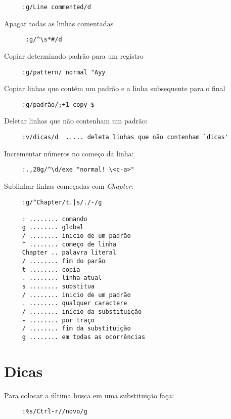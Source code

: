 \begin{verbatim}
     :g/Line commented/d
\end{verbatim}

Apagar todas as linhas comentadas

\begin{verbatim}
      :g/^\s*#/d
\end{verbatim}

Copiar determinado padrão para um registro

\begin{verbatim}
     :g/pattern/ normal "Ayy
\end{verbatim}

Copiar linhas que contém um padrão e a linha subsequente para o final

\begin{verbatim}
     :g/padrão/;+1 copy $
\end{verbatim}

Deletar linhas que não contenham um padrão:

\begin{verbatim}
     :v/dicas/d  ..... deleta linhas que não contenham `dicas'
\end{verbatim}

Incrementar números no começo da linha:

\begin{verbatim}
     :.,20g/^\d/exe "normal! \<c-a>"
\end{verbatim}

Sublinhar linhas começadas com {\em Chapter}:

\begin{verbatim}
     :g/^Chapter/t.|s/./-/g

     : ........ comando
     g ........ global
     / ........ inicio de um padrão
     ^ ........ começo de linha
     Chapter .. palavra literal
     / ........ fim do parão
     t ........ copia
     . ........ linha atual
     s ........ substitua
     / ........ inicio de um padrão
     . ........ qualquer caractere
     / ........ início da substituição
     - ........ por traço
     / ........ fim da substituição
     g ........ em todas as ocorrências
\end{verbatim}

\section{Dicas }
Para colocar a última busca em uma substituição faça:

\begin{verbatim}
     :%s/Ctrl-r//novo/g
\end{verbatim}


